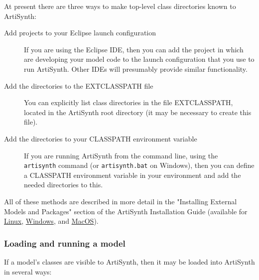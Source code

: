 At present there are three ways to make top-level class directories
known to ArtiSynth:

\begin{description}

\item[Add projects to your Eclipse launch configuration]\mbox{}

If you are using the Eclipse IDE, then you can add the project in
which are developing your model code to the launch configuration that
you use to run ArtiSynth. Other IDEs will presumably provide similar
functionality.

\item[Add the directories to the EXTCLASSPATH file]\mbox{}

You can explicitly list class directories in the file EXTCLASSPATH,
located in the ArtiSynth root directory (it may be necessary to create
this file).

\item[Add the directories to your CLASSPATH environment variable]\mbox{}

If you are running ArtiSynth from the command line, using the {\tt
artisynth} command (or {\tt artisynth.bat} on Windows), then you can
define a CLASSPATH environment variable in your environment and add
the needed directories to this.

\end{description}

All of these methods are described in more detail in the "Installing
External Models and Packages" section of the ArtiSynth Installation
Guide (available for \href{../installation/linuxInstallation.html}{Linux}, 
\href{../installation/windowsInstallation.html}{Windows}, and
\href{../installation/macosInstallation.html}{MacOS}).

\subsubsection{Loading and running a model}
\label{LoadingAndRunning:sec}

If a model's classes are visible to ArtiSynth, then it may be loaded
into ArtiSynth in several ways:

